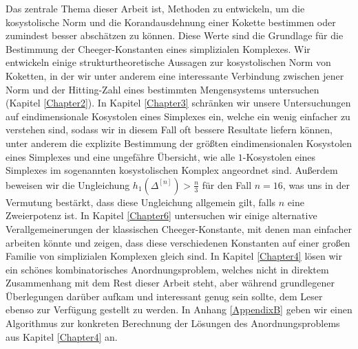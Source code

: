 \documentclass[11pt,english,onehalfspacing,headsepline]{MastersDoctoralThesis}
\begin{document}

\begin{Zusammenfassung}
Das zentrale Thema dieser Arbeit ist, Methoden zu entwickeln, um die kosystolische Norm und die Korandausdehnung einer Kokette bestimmen oder zumindest besser abschätzen zu können. Diese Werte sind die Grundlage für die Bestimmung der Cheeger-Konstanten eines simplizialen Komplexes. Wir entwickeln einige strukturtheoretische Aussagen zur kosystolischen Norm von Koketten, in der wir unter anderem eine interessante Verbindung zwischen jener Norm und der Hitting-Zahl eines bestimmten Mengensystems untersuchen (Kapitel \ref{Chapter2}). In Kapitel \ref{Chapter3} schränken wir unsere Untersuchungen auf eindimensionale Kosystolen eines Simplexes ein, welche ein wenig einfacher zu verstehen sind, sodass wir in diesem Fall oft bessere Resultate liefern können, unter anderem die explizite Bestimmung der größten eindimensionalen Kosystolen eines Simplexes und eine ungefähre Übersicht, wie alle \(1\)-Kosystolen eines Simplexes im sogenannten kosystolischen Komplex angeordnet sind. Außerdem beweisen wir die Ungleichung \(h_1(\Delta^{[n]})>\frac{n}{3}\) für den Fall \(n=16\), was uns in der Vermutung bestärkt, dass diese Ungleichung allgemein gilt, falls \(n\) eine Zweierpotenz ist. In Kapitel \ref{Chapter6} untersuchen wir einige alternative Verallgemeinerungen der klassischen Cheeger-Konstante, mit denen man einfacher arbeiten könnte und zeigen, dass diese verschiedenen Konstanten auf einer großen Familie von simplizialen Komplexen gleich sind. In Kapitel \ref{Chapter4} lösen wir ein schönes kombinatorisches Anordnungsproblem, welches nicht in direktem Zusammenhang mit dem Rest dieser Arbeit steht, aber während grundlegener Überlegungen darüber aufkam und interessant genug sein sollte, dem Leser ebenso zur Verfügung gestellt zu werden. In Anhang \ref{AppendixB} geben wir einen Algorithmus zur konkreten Berechnung der Lösungen des Anordnungsproblems aus Kapitel \ref{Chapter4} an.
\end{Zusammenfassung}

\end{document}
